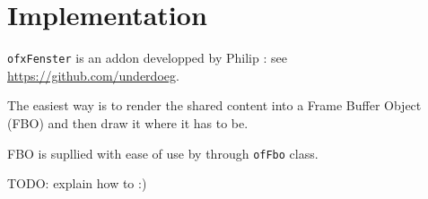 \documentclass[a4paper,titlepage,oneside]{article}
\newcommand{\ofxFenster}{\texttt{ofxFenster}}
\begin{document}
\section{Implementation}
\ofxFenster{} is an addon developped by Philip : see
\url{https://github.com/underdoeg}.

The easiest way is to render the shared content into a Frame Buffer Object (FBO) and then draw it where it has to be.

FBO is supllied with ease of use by \OF{} through \lstinline[basicstyle=\footnotesize\ttfamily]{ofFbo} class.

TODO: explain how to :)

\newpage
\printbibheading
\printbibliography[nottype=online,check=notonline,heading=subbibliography,title={Bibliography}]
\printbibliography[check=online,heading=subbibliography,title={Webography}]
\nocite{openframeworks,ofxUI,REZAALI,OF_TUTORIALS_ofauckland,ofBook}
\end{document}

